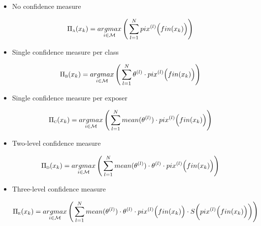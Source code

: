\documentclass[]{article}
\begin{document}
\begin{itemize}
		\item No confidence measure

\begin{equation}
	\Pi_\textrm{\textsc{a}}(x_k) = \mathop{argmax}\limits_{i \in \mathcal{M}}\Bigg(\sum_{l = 1}^N pix^{(l)}\Big(fin(x_k)\Big)\Bigg)
\end{equation}

	\item Single confidence measure per class

\begin{equation}
	\Pi_\textrm{\textsc{b}}(x_k) = \mathop{argmax}\limits_{i \in \mathcal{M}}\Bigg(\sum_{l = 1}^N\theta^{(l)}\cdot pix^{(l)}\Big(fin(x_k)\Big)\Bigg)
\end{equation}

	\item Single confidence measure per exposer


\begin{equation}
	\Pi_\textrm{\textsc{c}}(x_k) = \mathop{argmax}\limits_{i \in \mathcal{M}}\Bigg(\sum_{l = 1}^N mean(\theta^{(l)})\cdot pix^{(l)}\Big(fin(x_k)\Big)\Bigg)
\end{equation}

	\item Two-level confidence measure

\begin{equation}
	\Pi_\textrm{\textsc{d}}(x_k) = \mathop{argmax}\limits_{i \in \mathcal{M}}\Bigg(\sum_{l = 1}^N mean(\theta^{(l)})\cdot \theta^{(l)} \cdot pix^{(l)}\Big(fin(x_k)\Big)\Bigg)
\end{equation}

	\item Three-level confidence measure

\begin{equation}
	\Pi_\textrm{\textsc{e}}(x_k) = \mathop{argmax}\limits_{i \in \mathcal{M}}\Bigg(\sum_{l = 1}^N mean(\theta^{(l)})\cdot \theta^{(l)} \cdot pix^{(l)}\Big(fin(x_k)\Big)\cdot S\bigg(pix^{(l)}\Big(fin(x_k)\Big)\bigg)\Bigg)
\end{equation}

\end{itemize}
\end{document}
